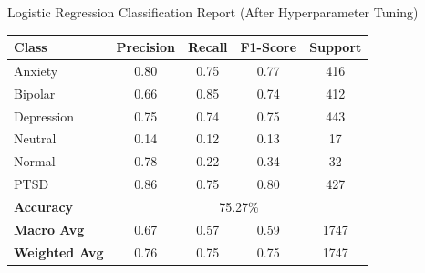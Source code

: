 \begin{center}
Logistic Regression Classification Report (After Hyperparameter Tuning) \\
\begin{tabular}{|l|c|c|c|c|}
\hline
\textbf{Class} & \textbf{Precision} & \textbf{Recall} & \textbf{F1-Score} & \textbf{Support} \\ \hline
Anxiety        & 0.80               & 0.75            & 0.77              & 416              \\ \hline
Bipolar        & 0.66               & 0.85            & 0.74              & 412              \\ \hline
Depression     & 0.75               & 0.74            & 0.75              & 443              \\ \hline
Neutral        & 0.14               & 0.12            & 0.13              & 17               \\ \hline
Normal         & 0.78               & 0.22            & 0.34              & 32               \\ \hline
PTSD           & 0.86               & 0.75            & 0.80              & 427              \\ \hline
\textbf{Accuracy} & \multicolumn{4}{|c|}{75.27\%} \\ \hline
\textbf{Macro Avg} & 0.67            & 0.57            & 0.59              & 1747             \\ \hline
\textbf{Weighted Avg} & 0.76         & 0.75            & 0.75              & 1747             \\ \hline
\end{tabular} \\

  \vspace{0.25in}%


\end{center}
